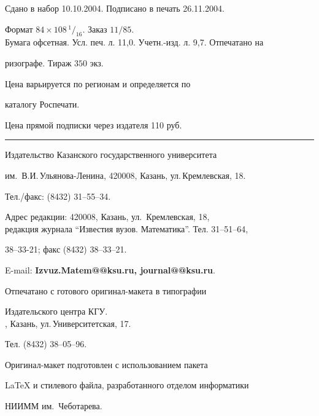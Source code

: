 \noindent Сдано в набор 10.10.2004. Подписано в печать 26.11.2004.


Формат $84\times 108 \,^1/_{16}.$ Заказ $11/85$.\\


Бумага офсетная. Усл. печ. л. 11,0. Учетн.-изд. л. 9,7. Отпечатано на 


ризографе. Тираж $350$ экз. 





\noindent Цена варьируется по регионам и определяется по 


каталогу Роспечати. 





\noindent Цена прямой подписки через издателя 110 руб. 


\bigskip


\hrule


\bigskip


\noindent Издательство Казанского государственного университета


им.~В.И.\,Ульянова-Ленина, 420008, Казань, ул.\,Кремлевская, 18.


Тел./факс: (8432) 31--55--34.\\


\smallskip





\noindent Адрес редакции: 420008, Казань, ул.~Кремлевская, 18,\\  


редакция журнала  ``Известия вузов. Математика''. Тел. 31--51--64,


38--33-21; факс (8432) 38--33--21.





\noindent E-mail: {\bf Izvuz.Matem@@ksu.ru, journal@@ksu.ru}. \par


\bigskip 


\noindent Отпечатано с готового оригинал-макета в типографии


Издательского центра КГУ. \\





, Казань, ул.\,Университетская, 17.


Тел. (8432) 38--05--96. \par


\bigskip


\noindent Оригинал-макет подготовлен с использованием пакета


\AmS\LaTeX{} и стилевого файла, разработанного отделом информатики


НИИММ им.~Чеботарева.








